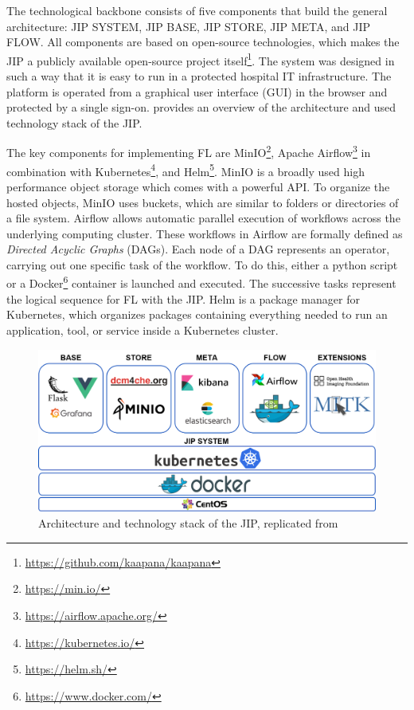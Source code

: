 The technological backbone consists of five components that build the general architecture: JIP SYSTEM, JIP BASE, JIP STORE, JIP META, and JIP FLOW. All components are based on open-source technologies, which makes the JIP a publicly available open-source project itself\footnote{\url{https://github.com/kaapana/kaapana}}. The system was designed in such a way that it is easy to run in a protected hospital IT infrastructure. The platform is operated from a graphical user interface (GUI) in the browser and protected by a single sign-on.  provides an overview of the architecture and used technology stack of the JIP.


The key components for implementing FL are MinIO\footnote{\url{https://min.io/}}, Apache Airflow\footnote{\url{https://airflow.apache.org/}} in combination with Kubernetes\footnote{\url{https://kubernetes.io/}}, and Helm\footnote{\url{https://helm.sh/}}.
MinIO is a broadly used high performance object storage which comes with a powerful API. To organize the hosted objects, MinIO uses buckets, which are similar to folders or directories of a file system. 
Airflow allows automatic parallel execution of workflows across the underlying computing cluster. These workflows in Airflow are formally defined as \textit{Directed Acyclic Graphs} (DAGs). Each node of a DAG represents an operator, carrying out one specific task of the workflow. To do this, either a python script or a Docker\footnote{\url{https://www.docker.com/}} container is launched and executed.
The successive tasks represent the logical sequence for FL with the JIP.
Helm is a package manager for Kubernetes, which organizes packages containing everything needed to run an application, tool, or service inside a Kubernetes cluster.

\begin{figure}[htbp]
    \centerline{\includegraphics[width=1.0\columnwidth]{1_Figures/JIParchitecture.png}}
    \caption[Architecture and technology stack of the JIP]{Architecture and technology stack of the JIP, replicated from \cite{Scherer2020JointAnalytics}}
\label{fig:JIP}
\end{figure}
